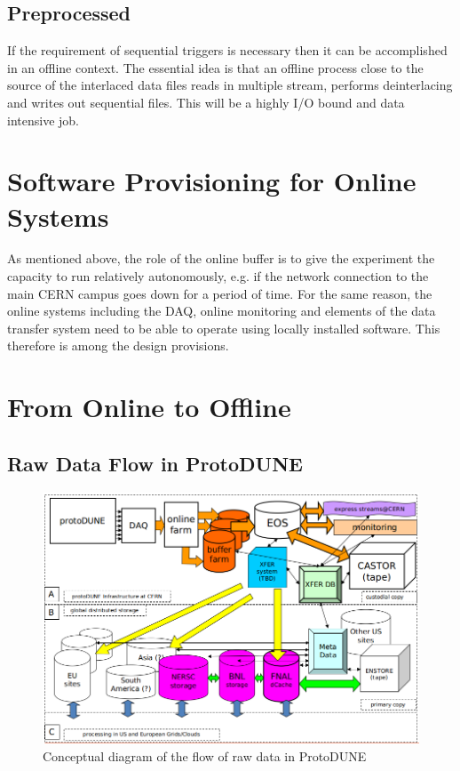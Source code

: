 \documentclass[pdftex,12pt,letter]{article}
\newcommand{\pd}{ProtoDUNE\xspace}
\begin{document}
\subsection{Preprocessed}

If the requirement of sequential triggers is necessary then it can be
accomplished in an offline context.  The essential idea is that an
offline process close to the source of the interlaced data files reads
in multiple stream, performs deinterlacing and writes out sequential
files.  This will be a highly I/O bound and data intensive job.

\section{Software Provisioning for Online Systems}
As mentioned above, the role of the online buffer is to give the experiment the capacity
to run relatively autonomously, e.g. if the network connection to the main CERN campus
goes down for a period of time. For the same reason, the online systems including the
DAQ, online monitoring and elements of the data transfer system need to be able to operate
using locally installed software. This therefore is among the design provisions.


\section{From Online to Offline}

\subsection{Raw Data Flow in \pd}
\label{sec:raw_concept}
\begin{figure}[tbh]
\centering\includegraphics[width=\linewidth]{../figures/protoDUNE_raw_data_concept.png}
\caption{\label{fig:raw_concept}Conceptual diagram of the flow of raw data in \pd}
\end{figure}
\end{document}
